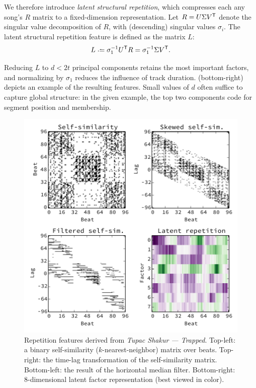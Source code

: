 \documentclass{article}
\begin{document}
We therefore introduce \emph{latent structural repetition}, which compresses each
any song's $R$ matrix to a fixed-dimension representation.  Let $R = U\Sigma V^\mathsf{T}$ denote the singular value decomposition of $R$,
with (descending) singular values $\sigma_i$. 
The latent structural repetition feature is defined as the matrix $L$:
\begin{equation}
L \defeq \sigma_1^{-1} U\trans R = \sigma_1^{-1} \Sigma V\trans.\label{eq:latent-rep}
\end{equation}

Reducing $L$ to $d < 2t$ principal components retains the most important factors, and normalizing by $\sigma_1$ reduces 
the influence of track duration. 
 (bottom-right) depicts an example of the resulting features.  
Small values of $d$ often suffice to capture global structure: in the given
example, the top two components code for segment position and membership.

\begin{figure}
\centering%
\includegraphics[width=\columnwidth]{figs/rep}
\vspace{-2\baselineskip}
\caption{Repetition features derived from \emph{Tupac Shakur --- Trapped}. 
Top-left: a binary self-similarity ($k$-nearest-neighbor) matrix over beats.
Top-right: the time-lag transformation of the self-similarity matrix.
Bottom-left: the result of the horizontal median filter.
Bottom-right: 8-dimensional latent factor representation (best viewed in color).}
\label{fig:rep}
\end{figure}
\end{document}
